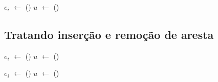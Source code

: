 \begin{algorithm}[htb]
\caption{\LCOSplice($d$, $e$)}
\label{Algo:LCOSplice}
\begin{algorithmic}[1]
\State $e_i$ $\gets$ \linkcutCreate()
\EndFor
\State $u$ $\gets$ \linkcutCreate()
\end{algorithmic}
\end{algorithm}


\subsection{Tratando inserção e remoção de aresta}

\begin{algorithm}[htb]
\caption{\MSFaddEdge($d$, $e$)}
\label{Algo:MSFaddEdge}
\begin{algorithmic}[1]
\State $e_i$ $\gets$ \linkcutCreate()
\EndFor
\State $u$ $\gets$ \linkcutCreate()
\end{algorithmic}
\end{algorithm}


\begin{algorithm}[htb]
\caption{\MSFdelEdge($d$, $e$)}
\label{Algo:MSFaddEdge}
\begin{algorithmic}[1]
\State $e_i$ $\gets$ \linkcutCreate()
\EndFor
\State $u$ $\gets$ \linkcutCreate()
\end{algorithmic}
\end{algorithm}
